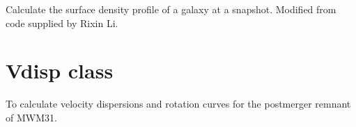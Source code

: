 \documentclass[letterpaper,10pt,english]{sphinxmanual}
\begin{document}
\begin{fulllineitems}
\label{\detokenize{surfacedensity:galaxy.surfacedensity.SurfaceDensityProfile}}
Calculate the surface density profile of a galaxy at a snapshot.
Modified from code supplied by Rixin Li.

\begin{fulllineitems}
\label{\detokenize{surfacedensity:galaxy.surfacedensity.SurfaceDensityProfile.plot_xy}}
\end{fulllineitems}


\end{fulllineitems}

\label{\detokenize{remvdisp:module-galaxy.remvdisp}}

\chapter{Vdisp class}
\label{\detokenize{remvdisp:vdisp-class}}\label{\detokenize{remvdisp::doc}}
To calculate velocity dispersions and rotation curves for the post\sphinxhyphen{}merger remnant of MW\sphinxhyphen{}M31.
\end{document}

